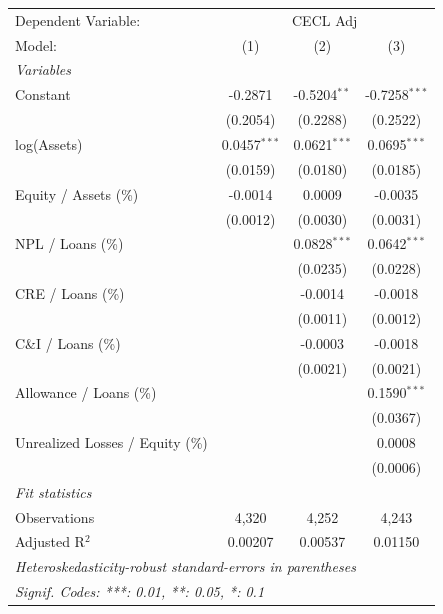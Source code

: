 
\begingroup
\centering
\begin{tabular}{lccc}
   \tabularnewline \midrule \midrule
   Dependent Variable: & \multicolumn{3}{c}{CECL Adj}\\
   Model:                           & (1)            & (2)            & (3)\\  
   \midrule
   \emph{Variables}\\
   Constant                         & -0.2871        & -0.5204$^{**}$ & -0.7258$^{***}$\\   
                                    & (0.2054)       & (0.2288)       & (0.2522)\\   
   log(Assets)                      & 0.0457$^{***}$ & 0.0621$^{***}$ & 0.0695$^{***}$\\   
                                    & (0.0159)       & (0.0180)       & (0.0185)\\   
   Equity / Assets (\%)             & -0.0014        & 0.0009         & -0.0035\\   
                                    & (0.0012)       & (0.0030)       & (0.0031)\\   
   NPL / Loans (\%)                 &                & 0.0828$^{***}$ & 0.0642$^{***}$\\   
                                    &                & (0.0235)       & (0.0228)\\   
   CRE / Loans (\%)                 &                & -0.0014        & -0.0018\\   
                                    &                & (0.0011)       & (0.0012)\\   
   C\&I / Loans (\%)                &                & -0.0003        & -0.0018\\   
                                    &                & (0.0021)       & (0.0021)\\   
   Allowance / Loans (\%)           &                &                & 0.1590$^{***}$\\   
                                    &                &                & (0.0367)\\   
   Unrealized Losses / Equity (\%)  &                &                & 0.0008\\   
                                    &                &                & (0.0006)\\   
   \midrule
   \emph{Fit statistics}\\
   Observations                     & 4,320          & 4,252          & 4,243\\  
   Adjusted R$^2$                   & 0.00207        & 0.00537        & 0.01150\\  
   \midrule \midrule
   \multicolumn{4}{l}{\emph{Heteroskedasticity-robust standard-errors in parentheses}}\\
   \multicolumn{4}{l}{\emph{Signif. Codes: ***: 0.01, **: 0.05, *: 0.1}}\\
\end{tabular}
\par\endgroup



